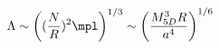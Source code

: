 \begin{equation}
\Lambda \sim \left((\frac{N}{R})^2 \mpl \right)^{1/3}
\sim \left(\frac{M_{5D}^3 R}{a^4} \right)^{1/6}
\end{equation}

